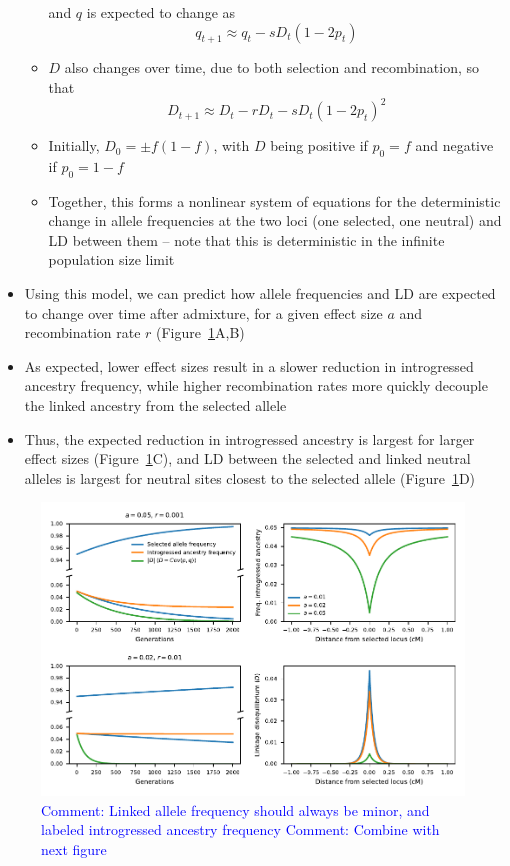 \documentclass{article}
\newcommand{\aprcomment}[1]{{\textcolor{blue}{Comment: #1}}}
\begin{document}
\begin{itemize}
\begin{itemize}
                and $q$ is expected to change as \[q_{t+1} \approx q_t - s D_t(1-2p_t)\]
            \item $D$ also changes over time, due to both selection and recombination,
                so that \[D_{t+1} \approx D_t - r D_t - s D_t (1-2p_t)^2\]
            \item Initially, $D_0 = \pm f(1-f)$, with $D$ being positive if $p_0=f$
                and negative if $p_0=1-f$
            \item Together, this forms a nonlinear system of equations for the
                deterministic change in allele frequencies at the two loci (one
                selected, one neutral) and LD between them -- note that this is
                deterministic in the infinite population size limit
        \end{itemize}
    \item Using this model, we can predict how allele frequencies and LD are expected
        to change over time after admixture, for a given effect size $a$ and 
        recombination rate $r$ (Figure~\ref{fig:linkage-pred}A,B)
    \item As expected, lower effect sizes result in a slower reduction in introgressed
        ancestry frequency, while higher recombination rates more quickly decouple
        the linked ancestry from the selected allele
    \item Thus, the expected reduction in introgressed ancestry is largest for
        larger effect sizes (Figure~\ref{fig:linkage-pred}C), and LD between the
        selected and linked neutral alleles is largest for neutral sites closest
        to the selected allele (Figure~\ref{fig:linkage-pred}D)
\end{itemize}


\begin{figure}[t!]
    \centering
    \includegraphics{../figures/linkage_predictions.pdf}
    \caption{
        \textbf{}
        \aprcomment{Linked allele frequency should always be minor, and labeled
        introgressed ancestry frequency}
        \aprcomment{Combine with next figure}
    }
    \label{fig:linkage-pred}
\end{figure}
\end{document}
